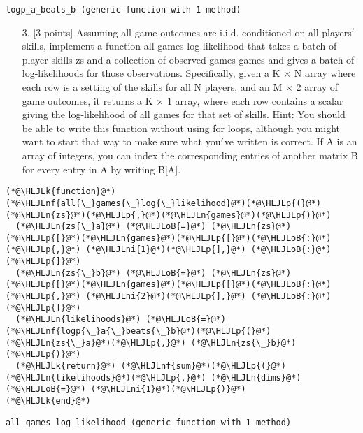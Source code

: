 \documentclass[12pt,a4paper]{article}
\newcommand{\HLJLk}[1]{\textcolor[RGB]{148,91,176}{\textbf{#1}}}
\newcommand{\HLJLn}[1]{#1}
\newcommand{\HLJLnf}[1]{\textcolor[RGB]{66,102,213}{#1}}
\newcommand{\HLJLni}[1]{\textcolor[RGB]{59,151,46}{#1}}
\newcommand{\HLJLoB}[1]{\textcolor[RGB]{102,102,102}{\textbf{#1}}}
\newcommand{\HLJLp}[1]{#1}
\begin{document}
\begin{lstlisting}
logp_a_beats_b (generic function with 1 method)
\end{lstlisting}


\begin{itemize}
\item[3. ] [3 points] Assuming all game outcomes are i.i.d. conditioned on all players\ensuremath{\rq} skills, implement a function all games log likelihood that takes a batch of player skills zs and a collection of observed games games and gives a batch of log-likelihoods for those observations. Specifically, given a K \ensuremath{\times} N array where each row is a setting of the skills for all N players, and an M \ensuremath{\times} 2 array of game outcomes, it returns a K \ensuremath{\times} 1 array, where each row contains a scalar giving the log-likelihood of all games for that set of skills. Hint: You should be able to write this function without using for loops, although you might want to start that way to make sure what you\ensuremath{\rq}ve written is correct. If A is an array of integers, you can index the corresponding entries of another matrix B for every entry in A by writing B[A].

\end{itemize}

\begin{lstlisting}
(*@\HLJLk{function}@*) (*@\HLJLnf{all{\_}games{\_}log{\_}likelihood}@*)(*@\HLJLp{(}@*)(*@\HLJLn{zs}@*)(*@\HLJLp{,}@*)(*@\HLJLn{games}@*)(*@\HLJLp{)}@*)
  (*@\HLJLn{zs{\_}a}@*) (*@\HLJLoB{=}@*) (*@\HLJLn{zs}@*)(*@\HLJLp{[}@*)(*@\HLJLn{games}@*)(*@\HLJLp{[}@*)(*@\HLJLoB{:}@*)(*@\HLJLp{,}@*) (*@\HLJLni{1}@*)(*@\HLJLp{],}@*) (*@\HLJLoB{:}@*)(*@\HLJLp{]}@*)
  (*@\HLJLn{zs{\_}b}@*) (*@\HLJLoB{=}@*) (*@\HLJLn{zs}@*)(*@\HLJLp{[}@*)(*@\HLJLn{games}@*)(*@\HLJLp{[}@*)(*@\HLJLoB{:}@*)(*@\HLJLp{,}@*) (*@\HLJLni{2}@*)(*@\HLJLp{],}@*) (*@\HLJLoB{:}@*)(*@\HLJLp{]}@*)
  (*@\HLJLn{likelihoods}@*) (*@\HLJLoB{=}@*) (*@\HLJLnf{logp{\_}a{\_}beats{\_}b}@*)(*@\HLJLp{(}@*)(*@\HLJLn{zs{\_}a}@*)(*@\HLJLp{,}@*) (*@\HLJLn{zs{\_}b}@*)(*@\HLJLp{)}@*)
  (*@\HLJLk{return}@*) (*@\HLJLnf{sum}@*)(*@\HLJLp{(}@*)(*@\HLJLn{likelihoods}@*)(*@\HLJLp{,}@*) (*@\HLJLn{dims}@*) (*@\HLJLoB{=}@*) (*@\HLJLni{1}@*)(*@\HLJLp{)}@*)
(*@\HLJLk{end}@*)
\end{lstlisting}

\begin{lstlisting}
all_games_log_likelihood (generic function with 1 method)
\end{lstlisting}
\end{document}
